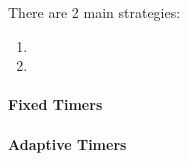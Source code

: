 There are 2 main strategies:
\begin{enumerate}[noitemsep]
\item {}
\item {}
\end{enumerate}

\paragraph{Fixed Timers}\label{par:Fixed_Packet_Timers}
\paragraph{Adaptive Timers}\label{par:Adaptive_Packet_Timers}

